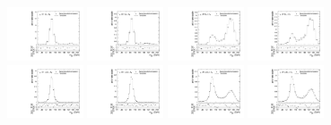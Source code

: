 \begin{figure}[htbp]
  \centering
  \includegraphics[width=0.2\textwidth]{fig/analysisAppendix/templateVsReco_res_r0_MJ_mu_HP_bb_LDy.pdf}
  \includegraphics[width=0.2\textwidth]{fig/analysisAppendix/templateVsReco_res_r0_MJ_e_HP_bb_LDy.pdf}
  \includegraphics[width=0.2\textwidth]{fig/analysisAppendix/templateVsReco_res_r0_MJ_mu_LP_bb_LDy.pdf}
  \includegraphics[width=0.2\textwidth]{fig/analysisAppendix/templateVsReco_res_r0_MJ_e_LP_bb_LDy.pdf}\\
  \includegraphics[width=0.2\textwidth]{fig/analysisAppendix/templateVsReco_res_r0_MJ_mu_HP_nobb_LDy.pdf}
  \includegraphics[width=0.2\textwidth]{fig/analysisAppendix/templateVsReco_res_r0_MJ_e_HP_nobb_LDy.pdf}
  \includegraphics[width=0.2\textwidth]{fig/analysisAppendix/templateVsReco_res_r0_MJ_mu_LP_nobb_LDy.pdf}
  \includegraphics[width=0.2\textwidth]{fig/analysisAppendix/templateVsReco_res_r0_MJ_e_LP_nobb_LDy.pdf}\\

\end{figure}

